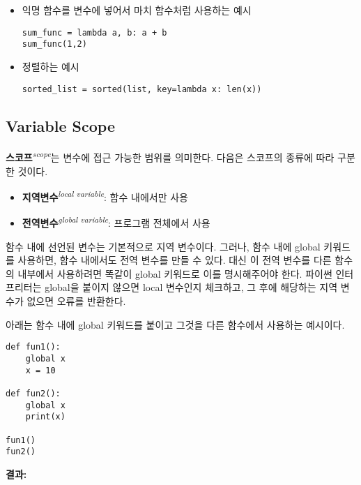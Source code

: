 \begin{itemize}
    \item 익명 함수를 변수에 넣어서 마치 함수처럼 사용하는 예시
\begin{tcolorbox}[colframe=black, colback=white]
\begin{verbatim}
sum_func = lambda a, b: a + b
sum_func(1,2)
\end{verbatim}
\end{tcolorbox}
    
    \item 정렬하는 예시
\begin{tcolorbox}[colframe=black, colback=white]
\begin{verbatim}
sorted_list = sorted(list, key=lambda x: len(x))
\end{verbatim}
\end{tcolorbox}
\end{itemize}

\subsection{Variable Scope}

\textbf{스코프}\textit{\textsuperscript{scope}}는 변수에 접근 가능한 범위를 의미한다. 다음은 스코프의 종류에 따라 구분한 것이다.

\begin{itemize}
    \item \textbf{지역변수}\textit{\textsuperscript{local variable}}: 함수 내에서만 사용
    \item \textbf{전역변수}\textit{\textsuperscript{global variable}}: 프로그램 전체에서 사용
\end{itemize}

함수 내에 선언된 변수는 기본적으로 지역 변수이다. 그러나, 함수 내에 global 키워드를 사용하면, 함수 내에서도 전역 변수를 만들 수 있다. 대신 이 전역 변수를 다른 함수의 내부에서 사용하려면 똑같이 global 키워드로 이를 명시해주어야 한다. 파이썬 인터프리터는 global을 붙이지 않으면 local 변수인지 체크하고, 그 후에 해당하는 지역 변수가 없으면 오류를 반환한다.

아래는 함수 내에 global 키워드를 붙이고 그것을 다른 함수에서 사용하는 예시이다.

\begin{minipage}{\textwidth}
\begin{tcolorbox}[colframe=black, colback=white]
\begin{verbatim}
def fun1():
    global x
    x = 10

def fun2():
    global x
    print(x)

fun1()
fun2()
\end{verbatim}
\end{tcolorbox}
\textbf{결과: }
\end{minipage}

